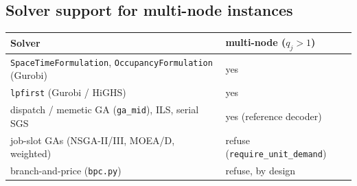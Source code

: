 \documentclass[11pt,a4paper]{article}
\newcommand{\code}[1]{\texttt{#1}}
\begin{document}
\subsection*{Solver support for multi-node instances}

\begin{center}
\begin{tabular}{@{}ll@{}}
\toprule
Solver & multi-node ($q_j>1$) \\
\midrule
\code{SpaceTimeFormulation}, \code{OccupancyFormulation} (Gurobi) & yes \\
\code{lpfirst} (Gurobi / HiGHS) & yes \\
dispatch / memetic GA (\code{ga\_mid}), ILS, serial SGS & yes (reference decoder) \\
job-slot GAs (NSGA-II/III, MOEA/D, weighted) & refuse (\code{require\_unit\_demand}) \\
branch-and-price (\code{bpc.py}) & refuse, by design \\
\bottomrule
\end{tabular}
\end{center}
\end{document}
